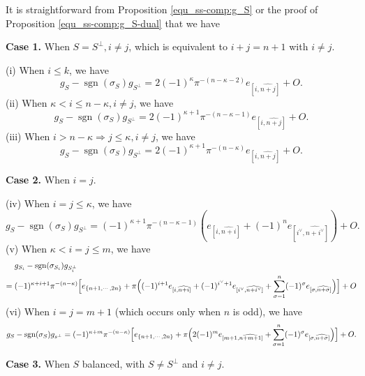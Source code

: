 \documentclass[pdflatex,sn-mathphys-num]{sn-jnl}%
\theoremstyle{thmstyleone}%
\theoremstyle{thmstyletwo}%
\numberwithin{equation}{subsection}
\theoremstyle{thmstylethree}%
\DeclareMathOperator{\sgn}{sgn}
\newcommand{\wh}{\widehat}
\begin{document}
It is straightforward from Proposition \ref{equ_ss-comp:g_S} or the proof of Proposition \ref{equ_ss-comp:g_S-dual} that we have 
\bigskip	

\noindent\textbf{Case 1.} When $S=S^\perp, i\neq j$, which is equivalent to $i+j=n+1$ with $i\neq j$.

\noindent (i) When $i\leq k$, we have
\[
	g_S-\sgn(\sigma_S)g_{S^\perp}
	=2(-1)^\kappa \pi^{-(n-\kappa-2)}e_{[i,\wh{n+j}]}+O.
\]
\noindent (ii) When $\kappa<i\leq n-\kappa,i\neq j$, we have
\[
    g_S-\sgn(\sigma_S)g_{S^\perp}
	=2(-1)^{\kappa+1} \pi^{-(n-\kappa-1)}e_{[i,\wh{n+j}]}+O.
\]
\noindent (iii) When $i>n-\kappa\Rightarrow j\leq \kappa,i\neq j$, we have 
\[
	g_S-\sgn(\sigma_S)g_{S^\perp}
	=2(-1)^{\kappa+1} \pi^{-(n-\kappa)}e_{[i,\wh{n+j}]}+O.
\]
			
\noindent\textbf{Case 2.} When $i=j$.

\noindent (iv) When $i=j\leq \kappa$, we have
\[
	g_S-\sgn(\sigma_S)g_{S^\perp}
	=(-1)^{\kappa+1}\pi^{-(n-\kappa-1)}
	\left(e_{[i,\wh{n+i}]}
	+(-1)^ne_{[i^\vee,\wh{n+i^\vee}]}\right)+O.
\]
\noindent (v) When $\kappa<i=j\leq m$, we have
\begin{align*}
	&g_{S_i}-\sgn(\sigma_{S_i})g_{S_i^\perp}\\
 ={}&(-1)^{\kappa+i+1}\pi^{-(n-\kappa)}\Bigl[e_{\{n+1,\cdots,2n\}}+\pi\Bigl(
	(-1)^{i+1}e_{[i,\wh{n+i}]}
	+(-1)^{i^\vee+1}e_{[i^\vee,\wh{n+i^\vee}]}
	+\sum_{\sigma=1}^n(-1)^\sigma e_{[\sigma,\wh{n+\sigma}]}\Bigr)\Bigr]+O
\end{align*}
(vi) When $i=j=m+1$ (which occurs only when $n$ is odd), we have
\begin{equation*}
    g_S-\sgn(\sigma_S)g_{s^\perp}=(-1)^{\kappa+m}\pi^{-(n-\kappa)}\Bigl[e_{\{n+1,\cdots,2n\}}
    +\pi\Bigl(2(-1)^{m}e_{[m+1,\wh{n+m+1}]}+
	\sum_{\sigma=1}^n (-1)^\sigma e_{[\sigma,\wh{n+\sigma}]}\Bigr)\Bigr]+O.
\end{equation*}
			
\noindent\textbf{Case 3.} When $S$ balanced, with $S \neq S^\perp$ and $i\neq j.$
\end{document}
